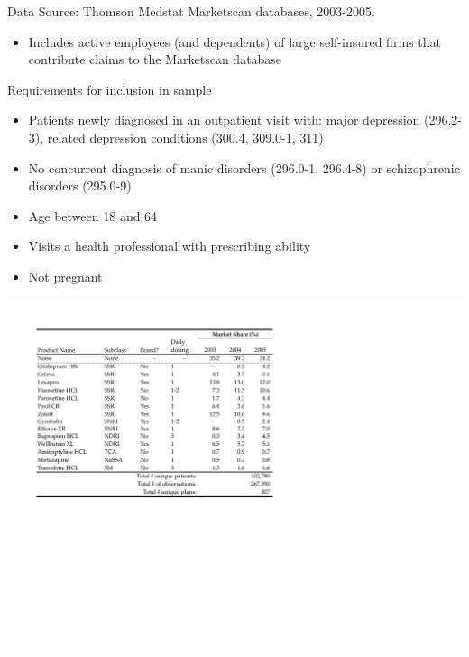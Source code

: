 \documentclass[xcolor=pdftex,dvipsnames,table,mathserif,aspectratio=169]{beamer}
\begin{document}

\begin{frame}{Data}
Source: Thomson Medstat Marketscan databases, 2003-2005.

\begin{itemize}
\item Includes active employees (and dependents) of large self-insured firms
that contribute claims to the Marketscan database
\end{itemize}

Requirements for inclusion in sample

\begin{itemize}
\item Patients newly diagnosed in an outpatient visit with: major depression
(296.2-3), related depression conditions (300.4, 309.0-1, 311)

\item No concurrent diagnosis of manic disorders (296.0-1, 296.4-8) or
schizophrenic disorders (295.0-9)

\item Age between 18 and 64

\item Visits a health professional with prescribing ability

\item Not pregnant
\end{itemize}
\end{frame}

\begin{frame}[plain]
\begin{center}
\includegraphics[width=0.9\linewidth]{./resources/slide_shares.pdf}
\end{center}
\end{frame}
\end{document}
